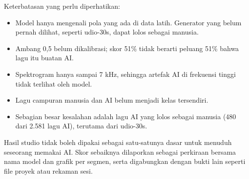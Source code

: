 Keterbatasan yang perlu diperhatikan:
\begin{itemize}
\item Model hanya mengenali pola yang ada di data latih. Generator yang belum pernah dilihat, seperti udio-30s, dapat lolos sebagai manusia.
\item Ambang 0,5 belum dikalibrasi; skor 51\% tidak berarti peluang 51\% bahwa lagu itu buatan AI.
\item Spektrogram hanya sampai 7 kHz, sehingga artefak AI di frekuensi tinggi tidak terlihat oleh model.
\item Lagu campuran manusia dan AI belum menjadi kelas tersendiri.
\item Sebagian besar kesalahan adalah lagu AI yang lolos sebagai manusia (480 dari 2.581 lagu AI), terutama dari udio-30s.
\end{itemize}

Hasil studio tidak boleh dipakai sebagai satu-satunya dasar untuk menuduh seseorang memakai AI. Skor sebaiknya dilaporkan sebagai perkiraan bersama nama model dan grafik per segmen, serta digabungkan dengan bukti lain seperti file proyek atau rekaman sesi.
